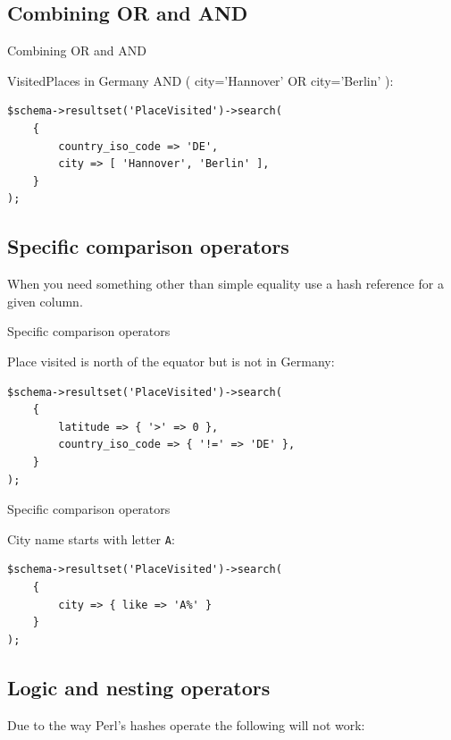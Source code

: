 \subsection{Combining OR and AND}


\begin{frame}[fragile]{Combining OR and AND}

VisitedPlaces in Germany AND ( city='Hannover' OR city='Berlin' ):

\begin{lstlisting}
$schema->resultset('PlaceVisited')->search(
    {
        country_iso_code => 'DE',
        city => [ 'Hannover', 'Berlin' ],
    }
);
\end{lstlisting}
\end{frame}

\subsection{Specific comparison operators}

When you need something other than simple equality use a hash reference for a given column.

\begin{frame}[fragile]{Specific comparison operators}

Place visited is north of the equator but is not in Germany:

\begin{lstlisting}
$schema->resultset('PlaceVisited')->search(
    {
        latitude => { '>' => 0 },
        country_iso_code => { '!=' => 'DE' },
    }
);
\end{lstlisting}
\end{frame}


\begin{frame}[fragile]{Specific comparison operators}

City name starts with letter \verb|A|:

\begin{lstlisting}
$schema->resultset('PlaceVisited')->search(
    {
        city => { like => 'A%' }
    }
);
\end{lstlisting}
\end{frame}

\subsection{Logic and nesting operators}

Due to the way Perl's hashes operate the following will not work:

